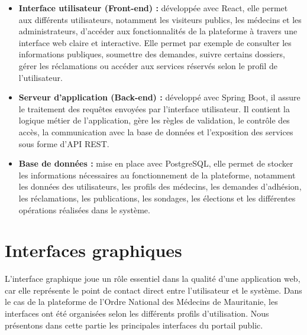 ﻿\documentclass[12pt,a4paper]{report}
\begin{document}
\begin{itemize}
    \item \textbf{Interface utilisateur (Front-end) :} développée avec React,
    elle permet aux différents utilisateurs, notamment les visiteurs publics,
    les médecins et les administrateurs, d'accéder aux fonctionnalités de la
    plateforme à travers une interface web claire et interactive. Elle permet
    par exemple de consulter les informations publiques, soumettre des demandes,
    suivre certains dossiers, gérer les réclamations ou accéder aux services
    réservés selon le profil de l'utilisateur.

    \item \textbf{Serveur d'application (Back-end) :} développé avec Spring
    Boot, il assure le traitement des requêtes envoyées par l'interface
    utilisateur. Il contient la logique métier de l'application, gère les règles
    de validation, le contrôle des accès, la communication avec la base de
    données et l'exposition des services sous forme d'API REST.

    \item \textbf{Base de données :} mise en place avec PostgreSQL, elle permet
    de stocker les informations nécessaires au fonctionnement de la plateforme,
    notamment les données des utilisateurs, les profils des médecins, les
    demandes d'adhésion, les réclamations, les publications, les sondages, les
    élections et les différentes opérations réalisées dans le système.
\end{itemize}





\section{Interfaces graphiques}

L’interface graphique joue un rôle essentiel dans la qualité d’une
application web, car elle représente le point de contact direct entre
l’utilisateur et le système. Dans le cas de la plateforme de l’Ordre
National des Médecins de Mauritanie, les interfaces ont été organisées
selon les différents profils d’utilisation. Nous présentons dans cette
partie les principales interfaces du portail public.
\end{document}
